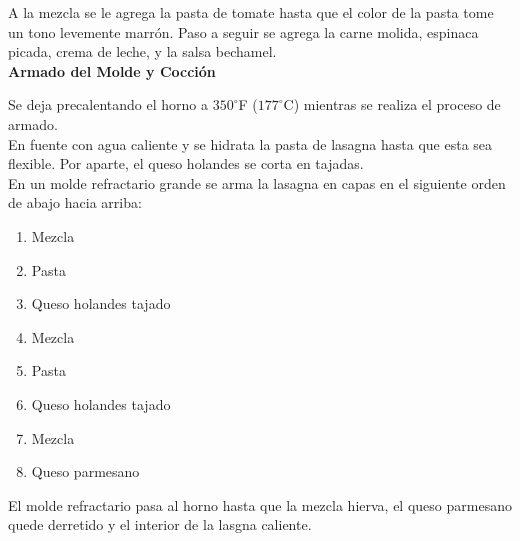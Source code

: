 A la mezcla se le agrega la pasta de tomate hasta que el color de la pasta tome un tono levemente marrón. Paso a seguir se agrega la carne molida, espinaca picada, crema de leche, y la salsa bechamel.\\

\textbf{Armado del Molde y Cocción}

Se deja precalentando el horno a $350^\circ$F ($177^\circ$C) mientras se realiza el proceso de armado.\\

En fuente con agua caliente y se hidrata la pasta de lasagna hasta que esta sea flexible. Por aparte, el queso holandes se corta en tajadas.\\

En un molde refractario grande se arma la lasagna en capas en el siguiente orden de abajo hacia arriba:\\

\begin{enumerate}
\item Mezcla
\item Pasta
\item Queso holandes tajado
\item Mezcla
\item Pasta
\item Queso holandes tajado
\item Mezcla
\item Queso parmesano
\end{enumerate}

El molde refractario pasa al horno hasta que la mezcla hierva, el queso parmesano quede derretido y el interior de la lasgna caliente.\\





